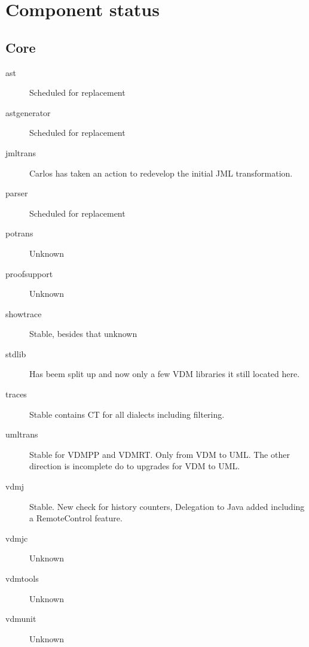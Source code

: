 \section{Component status}

\subsection{Core}
\begin{description}

\item[ast] Scheduled for replacement
\item[astgenerator] Scheduled for replacement
\item[jmltrans] Carlos has taken an action to redevelop the initial JML transformation.
\item[parser] Scheduled for replacement
\item[potrans] Unknown
\item[proofsupport] Unknown
\item[showtrace] Stable, besides that unknown
\item[stdlib] Has beem split up and now only a few VDM libraries it still located here.
\item[traces] Stable contains CT for all dialects including filtering. 
\item[umltrans] Stable for VDMPP and VDMRT. Only from VDM to UML. The other direction is incomplete do to upgrades for VDM to UML.
\item[vdmj] Stable. New check for history counters, Delegation to Java added including a RemoteControl feature.
\item[vdmjc] Unknown
\item[vdmtools] Unknown
\item[vdmunit] Unknown

\end{description}

